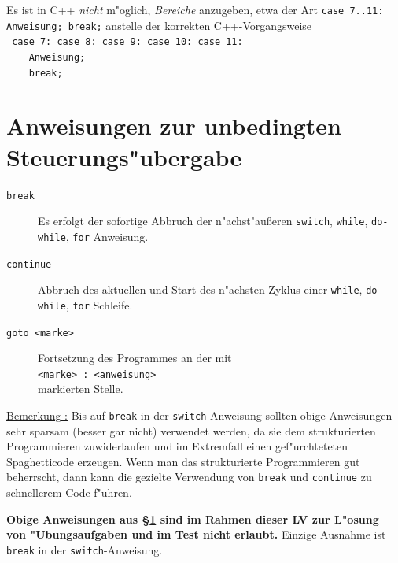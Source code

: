 Es ist in C++ \emph{nicht} m"oglich, \emph{Bereiche} anzugeben, etwa der Art
\texttt{case 7..11: Anweisung; break;} anstelle der korrekten
C++-Vorgangsweise~\cite[\S1.8.4]{Breymann:2017:DCP}
\\[0.5ex]
\verb| case 7: case 8: case 9: case 10: case 11:| \\
\verb|    Anweisung;| \\
\verb|    break;|
%
%
%
\section[Unbedingte Steuerungs"ubergabe]{Anweisungen zur unbedingten Steuerungs"ubergabe}
\label{p:4.8}
%
\begin{description}
 \item[\texttt{break}] Es erfolgt der sofortige Abbruch
	 der n"achst"au{\ss}eren
	 \verb|switch|, \verb|while|, \verb|do-while|, \verb|for|
	 Anweisung.
 \item[\texttt{continue}] Abbruch des aktuellen und Start des
 	n"achsten Zyklus einer \verb|while|, \verb|do-while|, \verb|for|
	Schleife.
 \item[\texttt{goto <marke>}] Fortsetzung des Programmes an der mit
 	\\
	\verb|<marke> : <anweisung>|
	\\
	markierten Stelle.
\end{description}

\underline{Bemerkung :} Bis auf \verb|break| in
der \verb|switch|-Anweisung sollten obige Anweisungen
sehr sparsam (besser gar nicht) verwendet werden, da
sie dem strukturierten Programmieren zuwiderlaufen und
im Extremfall einen gef"urchteteten Spaghetticode erzeugen.
Wenn man das strukturierte Programmieren gut beherrscht, dann kann die
gezielte Verwendung von \verb|break| und \verb|continue| zu schnellerem Code
f"uhren.

\textbf{Obige Anweisungen aus \S\ref{p:4.8} sind
im Rahmen dieser LV zur L"osung von "Ubungsaufgaben und im Test nicht erlaubt.}
Einzige Ausnahme ist \verb|break| in der \verb|switch|-Anweisung.






























